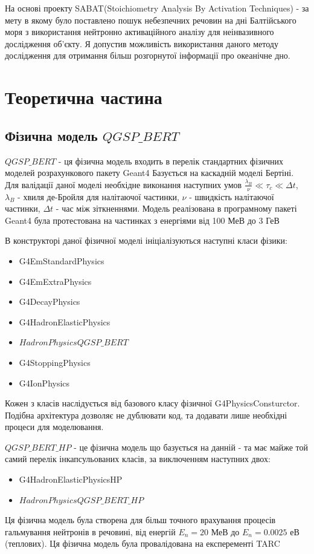 \documentclass[a4paper, 14pt]{article}
\numberwithin{equation}{section}
\numberwithin{table}{section}
\begin{document}
	На основі проекту SABAT(Stoichiometry Analysis By Activation Techniques) - за мету в якому було поставлено пошук небезпечних речовин на дні Балтійського моря з використання нейтронно активаційного аналізу для неінвазивного дослідження об'єкту. Я допустив можливість використання даного методу дослідження для отримання більш розгорнутої інформації про океанічне дно.		
	
	
	\setcounter{figure}{0} 
	\newpage
	\section{Теоретична частина}
	\setcounter{figure}{0} 
	\subsection{Фізична модель $QGSP\_BERT$}
	$QGSP\_BERT$ - ця фізична модель входить в перелік стандартних фізичних моделей розрахункового пакету Geant4
	Базується на каскадній моделі Бертіні. Для валідації даної моделі необхідне виконання наступних умов $\frac{\lambda_B}{\nu} \ll \tau_c \ll \Delta{t}$, $\lambda_B$ - хвиля де-Бройля для налітаючої частинки, $\nu$ - швидкість налітаючої частинки, $\Delta{t}$ - час між зіткненнями. 
	Модель реалізована в програмному пакеті Geant4 була протестована на частинках з енергіями від 100 МеВ до 3 ГеВ
	
	В конструкторі даної фізичної моделі ініціалізуються наступні класи фізики: 
	\begin{itemize}
		\item G4EmStandardPhysics
		\item G4EmExtraPhysics
		\item G4DecayPhysics
		\item G4HadronElasticPhysics
		\item $HadronPhysicsQGSP\_BERT$
		\item G4StoppingPhysics
		\item G4IonPhysics
	\end{itemize}
	Кожен з класів наслідується від базового класу фізичної G4PhysicsConsturctor. Подібна архітектура дозволяє не дублювати код, та додавати лише необхідні процеси для моделювання.
	
	$QGSP\_BERT\_HP$ - це фізична модель що базується на данній - та має майже той самий перелік інкапсульованих класів, за виключенням наступних двох:
	\begin{itemize}
		\item G4HadronElasticPhysicsHP
		\item $HadronPhysicsQGSP\_BERT\_HP$
	\end{itemize}
	Ця фізична модель була створена для більш точного врахування процесів гальмування нейтронів в речовині, від енергій $E_n = 20$ МеВ до $E_n = 0.0025$ еВ (теплових). Ця фізична модель була провалідована на експеременті TARC
	
\end{document}
